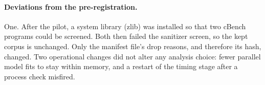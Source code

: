 \paragraph{Deviations from the pre-registration.}
One. After the pilot, a system library (zlib) was installed so that two cBench programs could be
screened. Both then failed the sanitizer screen, so the kept corpus is unchanged. Only the
manifest file's drop reasons, and therefore its hash, changed. Two operational changes did not
alter any analysis choice: fewer parallel model fits to stay within memory, and a restart of the
timing stage after a process check misfired.
